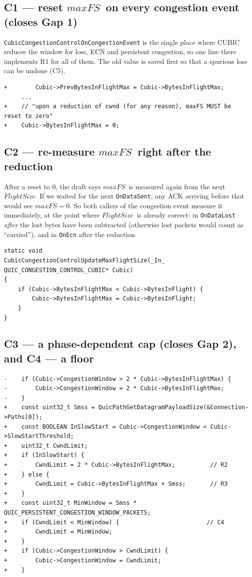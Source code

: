\documentclass[11pt,a4paper]{article}
\newcommand{\maxfs}{\ensuremath{\mathit{maxFS}}}
\newcommand{\fs}{\ensuremath{\mathit{FlightSize}}}
\begin{document}
\subsection*{C1 --- reset \maxfs\ on every congestion event (closes Gap 1)}

\texttt{CubicCongestionControlOnCongestionEvent} is the single place where
CUBIC reduces the window for loss, ECN and persistent congestion, so one
line there implements R1 for all of them. The old value is saved first so
that a spurious loss can be undone (C5).

\begin{lstlisting}[style=diff]
+        Cubic->PrevBytesInFlightMax = Cubic->BytesInFlightMax;
     ...
+    // "upon a reduction of cwnd (for any reason), maxFS MUST be reset to zero"
+    Cubic->BytesInFlightMax = 0;
\end{lstlisting}

\subsection*{C2 --- re-measure \maxfs\ right after the reduction}

After a reset to 0, the draft says \maxfs\ is measured again from the next
\fs. If we waited for the next \texttt{OnDataSent}, any ACK arriving before
that would see $\maxfs = 0$. So both callers of the congestion event measure
it immediately, at the point where \fs\ is already correct:
in \texttt{OnDataLost} \emph{after} the lost bytes have been subtracted
(otherwise lost packets would count as ``carried''), and in \texttt{OnEcn}
after the reduction.

\begin{lstlisting}
static void
CubicCongestionControlUpdateMaxFlightSize(_In_ QUIC_CONGESTION_CONTROL_CUBIC* Cubic)
{
    if (Cubic->BytesInFlightMax < Cubic->BytesInFlight) {
        Cubic->BytesInFlightMax = Cubic->BytesInFlight;
    }
}
\end{lstlisting}

\subsection*{C3 --- a phase-dependent cap (closes Gap 2), and C4 --- a floor}

\begin{lstlisting}[style=diff]
-    if (Cubic->CongestionWindow > 2 * Cubic->BytesInFlightMax) {
-        Cubic->CongestionWindow = 2 * Cubic->BytesInFlightMax;
-    }
+    const uint32_t Smss = QuicPathGetDatagramPayloadSize(&Connection->Paths[0]);
+    const BOOLEAN InSlowStart = Cubic->CongestionWindow < Cubic->SlowStartThreshold;
+    uint32_t CwndLimit;
+    if (InSlowStart) {
+        CwndLimit = 2 * Cubic->BytesInFlightMax;          // R2
+    } else {
+        CwndLimit = Cubic->BytesInFlightMax + Smss;       // R3
+    }
+    const uint32_t MinWindow = Smss * QUIC_PERSISTENT_CONGESTION_WINDOW_PACKETS;
+    if (CwndLimit < MinWindow) {                         // C4
+        CwndLimit = MinWindow;
+    }
+    if (Cubic->CongestionWindow > CwndLimit) {
+        Cubic->CongestionWindow = CwndLimit;
+    }
\end{lstlisting}
\end{document}
